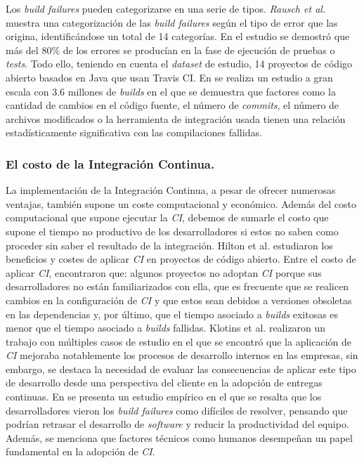 Los \textit{build failures} pueden categorizarse en una serie de tipos. \textit{Rausch et al.}
\cite{16} muestra una categorización de las \textit{build failures} según el tipo de error
que las origina, identificándose un total de 14 categorías. En el estudio se demostró que más
del 80\% de los errores se producían en la fase de ejecución de pruebas o \textit{tests}. Todo
ello, teniendo en cuenta el \textit{dataset} de estudio, 14 proyectos de código abierto basados
en Java que usan Travis CI. En \cite{19} se realiza un estudio a gran escala con 3.6 millones
de \textit{builds} en el que se demuestra que factores como la cantidad de cambios en el código
fuente, el número de \textit{commits}, el número de archivos modificados o la herramienta de
integración usada tienen una relación estadísticamente significativa con las compilaciones
fallidas.\\ 

\subsubsection{El costo de la Integración Continua.}
La implementación de la Integración Continua, a pesar de ofrecer numerosas ventajas, también
supone un coste computacional y económico. Además del costo computacional que supone ejecutar
la \textit{CI}, debemos de sumarle el costo que supone el tiempo no productivo de los
desarrolladores si estos no saben como proceder sin saber el resultado de la integración.
Hilton et al. \cite{2} estudiaron los beneficios y costes de aplicar \textit{CI} en proyectos
de código abierto. Entre el costo de aplicar \textit{CI}, encontraron que: algunos proyectos
no adoptan \textit{CI} porque sus desarrolladores no están familiarizados con ella, que es
frecuente que se realicen cambios en la configuración de \textit{CI} y que estos sean debidos
a versiones obsoletas en las dependencias y, por último, que el tiempo asociado a
\textit{builds} exitosas es menor que el tiempo asociado a \textit{builds} fallidas. Klotins et
al. \cite{21} realizaron un trabajo con múltiples casos de estudio en el que se encontró que
la aplicación de \textit{CI} mejoraba notablemente los procesos de desarrollo internos en las
empresas, sin embargo, se destaca la necesidad de evaluar las consecuencias de aplicar este
tipo de desarrollo desde una perspectiva del cliente en la adopción de entregas continuas. En
\cite{20} se presenta un estudio empírico en el que se resalta que los desarrolladores vieron
los \textit{build failures} como difíciles de resolver, pensando que podrían retrasar el
desarrollo de \textit{software} y reducir la productividad del equipo. Además, se menciona
que factores técnicos como humanos desempeñan un papel fundamental en la adopción de
\textit{CI}.\\


